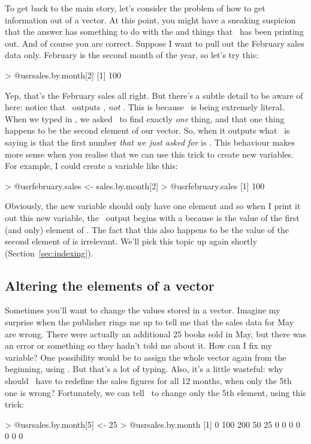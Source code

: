 To get back to the main story, let's consider the problem of how to get information out of a vector. At this point, you might have a sneaking suspicion that the answer has something to do with the \rtextoutput{[1]} and \rtextoutput{[9]} things that \R\ has been printing out. And of course you are correct. Suppose I want to pull out the February sales data only. February is the second month of the year, so let's try this:
\begin{rblock1}
> @usr{sales.by.month[2]}
[1] 100
\end{rblock1}
Yep, that's the February sales all right. But there's a subtle detail to be aware of here: notice that \R\ outputs , {\it not} . This is because \R\ is being extremely literal. When we typed in , we asked \R\ to find exactly {\it one} thing, and that one thing happens to be the second element of our  vector. So, when it outputs  what \R\ is saying is that the first number {\it that we just asked for} is . This behaviour makes more sense when you realise that we can use this trick to create new variables. For example, I could create a  variable like this:
\begin{rblock1}
> @usr{february.sales <- sales.by.month[2]}
> @usr{february.sales}
[1] 100
\end{rblock1}
Obviously, the new variable  should only have one element and so when I print it out this new variable, the \R\ output begins with a \rtextoutput{[1]} because  is the value of the first (and only) element of . The fact that this also happens to be the value of the second element of  is irrelevant. We'll pick this topic up again shortly (Section~\ref{sec:indexing}). 

\subsection{Altering the elements of a vector}

Sometimes you'll want to change the values stored in a vector. Imagine my surprise when the publisher rings me up to tell me that the sales data for May are wrong. There were actually an additional 25 books sold in May, but there was an error or something so they hadn't told me about it. How can I fix my  variable? One possibility would be to assign the whole vector again from the beginning, using . But that's a lot of typing. Also, it's a little wasteful: why should \R\ have to redefine the sales figures for all 12 months, when only the 5th one is wrong? Fortunately, we can tell \R\ to change only the 5th element, using this trick:
\begin{rblock1}
> @usr{sales.by.month[5] <- 25}
> @usr{sales.by.month}
 [1]   0 100 200  50  25   0   0   0   0   0   0   0
\end{rblock1}

